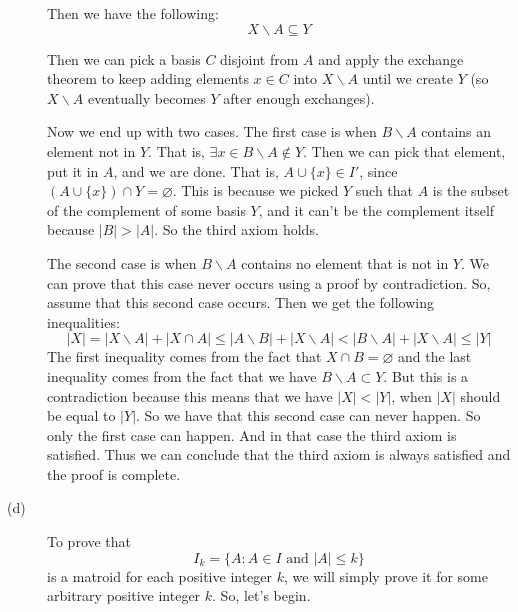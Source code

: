 \documentclass{article}
\begin{document}
\begin{description}
        Then we have the following:
        \[ X \backslash A \subseteq Y \]

        Then we can pick a basis $C$ disjoint from $A$ and apply the exchange theorem
        to keep adding elements $x \in C$ into $X \backslash A$ until we create
        $Y$ (so $X \backslash A$ eventually becomes $Y$ after enough exchanges).

        Now we end up with two cases.
        The first case is when $B \backslash A$ contains an element not in $Y$.
        That is, $\exists x \in B \backslash A \notin Y$. Then we can pick that
        element, put it in $A$, and we are  done. That is, $A \cup \{x\} \in
        I'$, since $(A \cup \{x\}) \cap Y = \varnothing$. This is because
        we picked $Y$ such that $A$ is the subset of the complement of some
        basis $Y$, and it can't be the complement itself because $|B| > |A|$.
        So the third axiom holds.

        The second case is when $B \backslash A$ contains no element that is not
        in $Y$. We can prove that this case never occurs using a proof by
        contradiction. So, assume that this second case occurs. Then we get the
        following inequalities:
        \[ |X| = |X \backslash A| + |X \cap A| \leq |A \backslash B| + |X
        \backslash A| < |B \backslash A| + |X \backslash A| \leq |Y| \]
        The first inequality comes from the fact that $X \cap B = \varnothing$
        and the last inequality comes from the fact that we have $B \backslash
        A \subset Y$. But this is a contradiction because this means that we
        have $|X| < |Y|$, when $|X|$ should be equal to $|Y|$. So we have that
        this second case can never happen. So only the first case can happen.
        And in that case the third axiom is satisfied. Thus we can conclude that
        the third axiom is always satisfied and the proof is complete.
    \item[(d)]
        To prove that
        \[ I_k = \{ A : A \in I \text{ and } |A| \leq k \} \]
        is a matroid for each positive integer $k$, we will simply prove it for
        some arbitrary positive integer $k$. So, let's begin.


\end{description}
\end{document}
